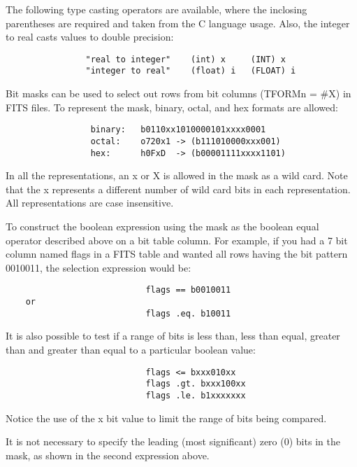 \documentclass[11pt]{book}
\begin{document}
    The  following  type  casting  operators  are  available,  where the
    inclosing parentheses are required and taken  from  the  C  language
    usage. Also, the integer to real casts values to double precision:

\begin{verbatim}
                "real to integer"    (int) x     (INT) x
                "integer to real"    (float) i   (FLOAT) i
\end{verbatim}

    Bit  masks can be used to select out rows from bit columns (TFORMn =
    \#X) in FITS files. To represent the mask,  binary,  octal,  and  hex
    formats are allowed:


\begin{verbatim}
                 binary:   b0110xx1010000101xxxx0001
                 octal:    o720x1 -> (b111010000xxx001)
                 hex:      h0FxD  -> (b00001111xxxx1101)
\end{verbatim}

    In  all  the  representations, an x or X is allowed in the mask as a
    wild card. Note that the x represents a  different  number  of  wild
    card  bits  in  each  representation.  All  representations are case
    insensitive.

    To construct the boolean expression using the mask  as  the  boolean
    equal  operator  described above on a bit table column. For example,
    if you had a 7 bit column named flags in a  FITS  table  and  wanted
    all  rows  having  the bit pattern 0010011, the selection expression
    would be:


\begin{verbatim}
                            flags == b0010011
    or
                            flags .eq. b10011
\end{verbatim}

    It is also possible to test if a range of bits is  less  than,  less
    than  equal,  greater  than  and  greater than equal to a particular
    boolean value:


\begin{verbatim}
                            flags <= bxxx010xx
                            flags .gt. bxxx100xx
                            flags .le. b1xxxxxxx
\end{verbatim}

    Notice the use of the x bit value to limit the range of  bits  being
    compared.

    It  is  not necessary to specify the leading (most significant) zero
    (0) bits in the mask, as shown in the second expression above.
\end{document}

